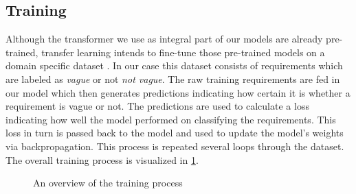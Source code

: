 \subsection{Training}
\label{chp:study:sec:design:subsec:training}
Although the transformer we use as integral part of our models are already pre-trained, transfer learning intends to fine-tune those pre-trained models on a domain specific dataset \parencite{Pan:2010}.
In our case this dataset consists of requirements which are labeled as \textit{vague} or not \textit{not vague}.
The raw training requirements are fed in our model which then generates predictions indicating how certain it is whether a requirement is vague or not.
The predictions are used to calculate a loss indicating how well the model performed on classifying the requirements.
This loss in turn is passed back to the model and used to update the model's weights via backpropagation.
This process is repeated several loops through the dataset.
The overall training process is visualized in \cref{fig:study:design:training}.

\begin{figure}[htpb]
    \centering
    \def\svgwidth{\columnwidth}
    
    \caption[Study Design: Training]{An overview of the training process}\label{fig:study:design:training}
\end{figure}
